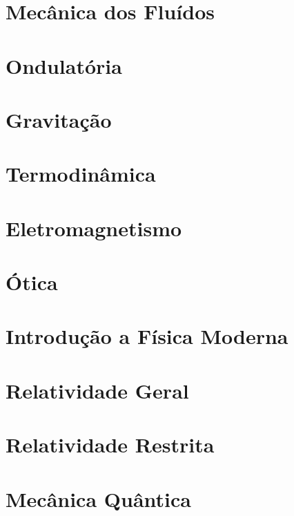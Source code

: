 \documentclass[10pt]{article} %
\begin{document}
    \section{Mecânica dos Fluídos}
    
    \section{Ondulatória}
    
    \section{Gravitação}
    
    \section{Termodinâmica}
    
    \section{Eletromagnetismo}
    
    \section{Ótica}
    
    \section{Introdução a Física Moderna}
    
    \section{Relatividade Geral}
    
    \section{Relatividade Restrita}
    
    \section{Mecânica Quântica}
    
\end{document}
